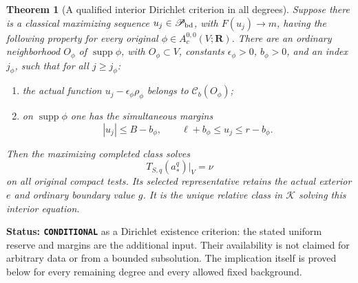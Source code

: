 \documentclass[11pt,a4paper]{article}
\numberwithin{equation}{section}
\newtheorem{theorem}{Theorem}[section]
\theoremstyle{definition}
\theoremstyle{remark}
\begin{document}
\begin{theorem}[A qualified interior Dirichlet criterion in all degrees]
\label{thm:r6-reserve-dirichlet-criterion}
Suppose there is a classical maximizing sequence
$u_j\in\mathscr P_{\rm bd}$, with $F(u_j)\to m$, having the following
property for every original $\phi\in A_c^{0,0}(V;\mathbf R)$.
There are an ordinary neighborhood $O_\phi$ of
$\operatorname{supp}\phi$, with $O_\phi\subset V$, constants
$\epsilon_\phi>0$, $b_\phi>0$, and an index $j_\phi$, such that
for all $j\ge j_\phi$:
\begin{enumerate}
\item the actual function $u_j-\epsilon_\phi\rho_\phi$ belongs to
      $\mathcal C_b(O_\phi)$;
\item on $\operatorname{supp}\phi$ one has the simultaneous margins
\[
  |u_j|\le B-b_\phi,
       \qquad \ell+b_\phi\le u_j\le r-b_\phi.
\]
\end{enumerate}
Then the maximizing completed class solves
\[
                   T_{S,q}(a_*^q)|_V=\nu
\]
on all original compact tests. Its selected representative retains the
actual exterior $e$ and ordinary boundary value $g$. It is the unique
relative class in $\mathscr K$ solving this interior equation.
\end{theorem}

\noindent\textbf{Status: \texttt{CONDITIONAL}} as a Dirichlet existence
criterion: the stated uniform reserve and margins are the additional
input. Their availability is not claimed for arbitrary data or from a
bounded subsolution. The implication itself is proved below for every
remaining degree and every allowed fixed background.
\end{document}
